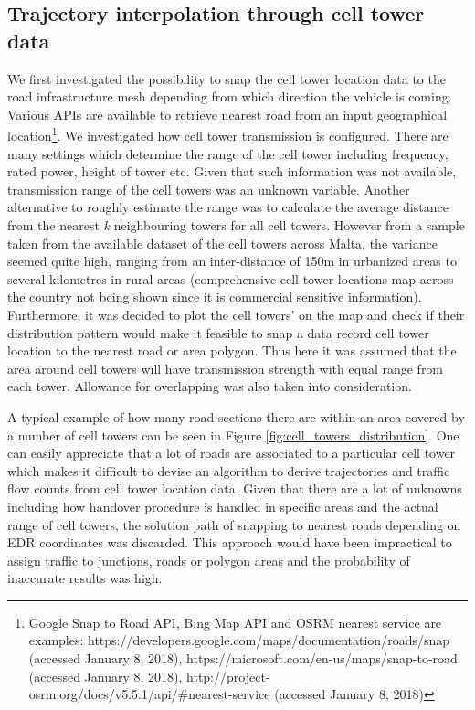 \documentclass[12pt, a4paper]{report}
\theoremstyle{definition}
\theoremstyle{definition}%
\theoremstyle{definition}%
\theoremstyle{definition}%
\theoremstyle{definition}%
\theoremstyle{definition}%
\begin{document}
\subsection{Trajectory interpolation through cell tower data} \label{subsection:methodology:trajectory_interpolation}
We first investigated the possibility to snap the cell tower location data to the road infrastructure mesh depending from which direction the vehicle is coming. Various APIs are available to retrieve nearest road from an input geographical location\footnote{Google Snap to Road API, Bing Map API and OSRM nearest service are examples: https://developers.google.com/maps/documentation/roads/snap (accessed January 8, 2018), https://microsoft.com/en-us/maps/snap-to-road (accessed January 8, 2018), http://project-osrm.org/docs/v5.5.1/api/\#nearest-service (accessed January 8, 2018)}. We investigated how cell tower transmission is configured. There are many settings which determine the range of the cell tower including frequency, rated power, height of tower etc. Given that such information was not available, transmission range of the cell towers was an unknown variable. Another alternative to roughly estimate the range was to calculate the average distance from the nearest \textit{k} neighbouring towers for all cell towers. However from a sample taken from the available dataset of the cell towers across Malta, the variance seemed quite high, ranging from an inter-distance of 150m in urbanized areas to several kilometres in rural areas (comprehensive cell tower locations map across the country not being shown since it is  commercial sensitive information). Furthermore, it was decided to plot the cell towers' on the map and check if their distribution pattern would make it feasible to snap a data record cell tower location to the nearest road or area polygon. Thus here it was assumed that the area around cell towers will have transmission strength with equal range from each tower. Allowance for overlapping was also taken into consideration. 

A typical example of how many road sections there are within an area covered by a number of cell towers can be seen in Figure \ref{fig:cell_towers_distribution}. One can easily appreciate that a lot of roads are associated to a particular cell tower which makes it difficult to devise an algorithm to derive trajectories and traffic flow counts from cell tower location data. Given that there are a lot of unknowns including how handover procedure is handled in specific areas and the actual range of cell towers, the solution path of snapping to nearest roads depending on EDR coordinates was discarded. This approach would have been impractical to assign traffic to junctions, roads or polygon areas and the probability of inaccurate results was high.
\end{document}

